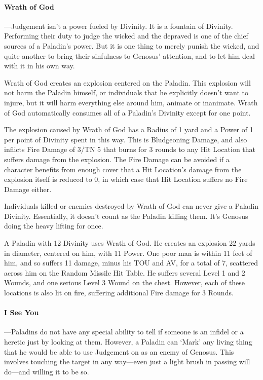 \documentclass[oneside,11pt,english]{book}
\begin{document}
\paragraph{Wrath of God}
---\quad Judgement isn't a power fueled by Divinity. It is a fountain of Divinity. Performing their duty to 
judge the wicked and the depraved is one of the chief sources of a Paladin's power. But it is one 
thing to merely punish the wicked, and quite another to bring their sinfulness to Genosus’ 
attention, and to let him deal with it in his own way. 


Wrath of God creates an explosion centered on the Paladin. This explosion will not harm the 
Paladin himself, or individuals that he explicitly doesn't want to injure, but it will harm 
everything else around him, animate or inanimate. Wrath of God automatically consumes all of a 
Paladin's Divinity except for one point. 


The explosion caused by Wrath of God has a Radius of 1 yard and a Power of 1 per point of 
Divinity spent in this way. This is Bludgeoning Damage, and also inflicts Fire Damage of 3/TN 5 
that burns for 3 rounds to any Hit Location that suffers damage from the explosion. The Fire 
Damage can be avoided if a character benefits from enough cover that a Hit Location's damage 
from the explosion itself is reduced to 0, in which case that Hit Location suffers no Fire Damage 
either. 


Individuals killed or enemies destroyed by Wrath of God can never give a Paladin Divinity. 
Essentially, it doesn't count as the Paladin killing them. It's Genosus doing the heavy lifting for 
once. 


A Paladin with 12 Divinity uses Wrath of God. He creates an explosion 22 yards in diameter, centered on him, with 11 
Power. One poor man is within 11 feet of him, and so suffers 11 damage, minus his TOU and AV, for a total of 7, 
scattered across him on the Random Missile Hit Table. He suffers several Level 1 and 2 Wounds, and one serious Level 
3 Wound on the chest. However, each of these locations is also lit on fire, suffering additional Fire damage for 3 
Rounds. 
 
\paragraph{I See You}
---\quad Paladins do not have any special ability to tell if someone is an infidel or a heretic just by looking 
at them. However, a Paladin can ‘Mark’ any living thing that he would be able to use Judgement 
on as an enemy of Genosus. This involves touching the target in any way—even just a light brush in passing will do—and willing it to be so.
\end{document}
